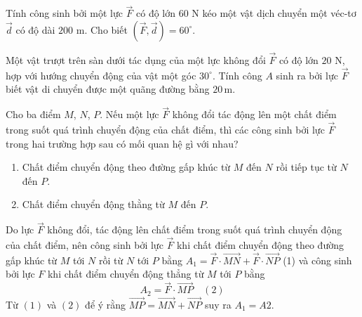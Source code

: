 \begin{bt}%
	Tính công sinh bởi một lực $\overrightarrow{F}$ có độ lớn $60$ N kéo một vật dịch chuyển một véc-tơ $\overrightarrow{d}$ có độ dài $200$ m. Cho biết $\left( \overrightarrow{F}, \overrightarrow{d} \right) = 60^\circ$.
\end{bt}

\begin{bt}%
	Một vật trượt trên sàn dưới tác dụng của một lực không đổi $\overrightarrow{F}$ có độ lớn $20$ N, hợp với hướng chuyển động của vật một góc $30^\circ$. Tính công $A$ sinh ra bởi lực $\overrightarrow{F}$ biết vật di chuyển được một quãng đường bằng $20\,\mathrm{m}$.
\end{bt}

\begin{bt}%
	Cho ba điểm $M$, $N$, $P$. Nếu một lực $\overrightarrow{F}$ không đổi tác động lên một chất điểm trong suốt quá trình chuyển động của chất điểm, thì các công sinh bởi lực $\overrightarrow{F}$ trong hai trường hợp sau có mối quan hệ gì với nhau?
	\begin{enumerate}
		\item Chất điểm chuyển động theo đường gấp khúc từ $M$ đến $N$ rồi tiếp tục từ $N$ đến $P$.
		\item Chất điểm chuyển động thằng từ $M$ đến $P$.
	\end{enumerate}
	\loigiai
	{
		Do lực $\overrightarrow{F}$ không đổi, tác động lên chất điểm trong suốt quá trình chuyển động của chất điểm, nên công sinh bởi lực $\overrightarrow{F}$ khi chất điểm chuyển động theo đường gấp khúc từ $M$ tới $N$ rồi từ $N$ tới $P$ bằng $A_{1}=\overrightarrow{F} \cdot \overrightarrow{M N}+\overrightarrow{F} \cdot \overrightarrow{N P}$ (1) và công sinh bởi lực $F$ khi chất điểm chuyển động thẳng từ $M$ tới $P$ bằng
		\[A_2=\overrightarrow{F}\cdot\overrightarrow{MP}\quad(2)\]
		Từ $(1)$ và $(2)$ để ý rằng $\overrightarrow{MP}=\overrightarrow{MN}+\overrightarrow{NP}$ suy ra $A_1=A2$.
	}
\end{bt}

